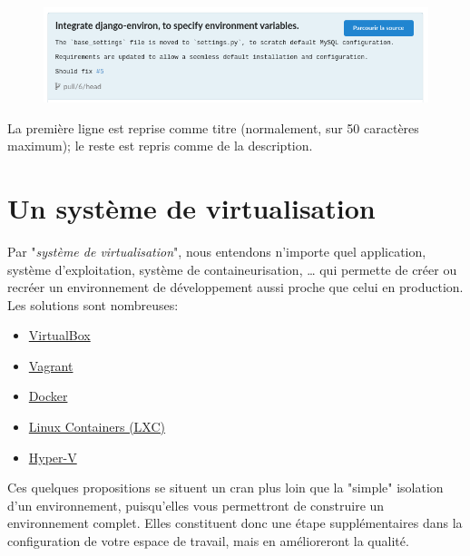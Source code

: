 \documentclass[11pt]{amsbook}
\begin{document}
\begin{figure}[h]{}
\centering\includegraphics[width=2.5truein]{images/environment/gitea-commit-message.png}
\caption{}

\end{figure}

La première ligne est reprise comme titre (normalement, sur 50 caractères maximum); le reste est repris comme de la description.


\hypertarget{x-un-système-de-virtualisation}{\section{Un système de virtualisation}}
Par "\emph{système de virtualisation}", nous entendons n’importe quel application, système d’exploitation, système de containeurisation, …​ qui permette de créer ou recréer un environnement de développement aussi proche que celui en production.
Les solutions sont nombreuses:


\begin{itemize}

\item \href{https://www.virtualbox.org/}{VirtualBox}

\item \href{https://www.vagrantup.com/}{Vagrant}

\item \href{https://www.docker.com/}{Docker}

\item \href{https://linuxcontainers.org/lxc/}{Linux Containers (LXC)}

\item \href{https://docs.microsoft.com/fr-fr/virtualization/hyper-v-on-windows/quick-start/enable-hyper-v}{Hyper-V}

\end{itemize}


Ces quelques propositions se situent un cran plus loin que la "simple" isolation d’un environnement, puisqu’elles vous permettront de construire un environnement complet.
Elles constituent donc une étape supplémentaires dans la configuration de votre espace de travail, mais en amélioreront la qualité.
\end{document}
